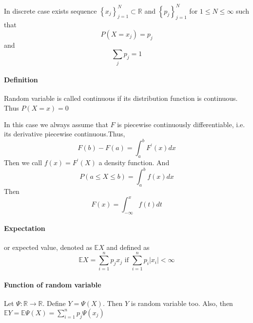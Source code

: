 In discrete case exists sequence $\left\{ x_j \right\}_{j=1}^N \subset \mathbb{R}$ and $\left\{ p_j \right\}_{j=1}^N$ for $1\leq N \leq \infty$ such that
$$P(X=x_j) =p_j$$ and $$\sum_j p_j = 1$$
\paragraph{Definition}
Random variable is called continuous if its distribution function is continuous. Thus
$P(X=x) = 0$

In this case we always assume that $F$ is piecewise continuously differentiable, i.e. its derivative piecewise continuous.Thus,
$$F(b) - F(a) = \int_a^b F^\prime(x) dx$$
Then we call $f(x) = F^\prime(X)$ a density function. And 
$$P(a\leq X \leq b) = \int_a^b f(x) dx$$
Then
$$F(x) = \int_{-\infty}^{x} f(t) dt$$
\paragraph{Expectation}  or expected value, denoted as $\mathbb{E}X$ and defined as
	$$\mathbb{E}X = \sum_{i=1}^{n} p_j x_j \text{ if } \sum_{i=1}^n p_i |x_i| < \infty $$ 
\paragraph{Function of random variable} Let $\Psi : \mathbb{R} \to \mathbb{R}$. Define $Y = \Psi(X)$. Then $Y$ is random variable too. Also, then $\mathbb{E}Y = \mathbb{E} \Psi(X) = \sum_{i=1}^{n} p_j \Psi(x_j)$
